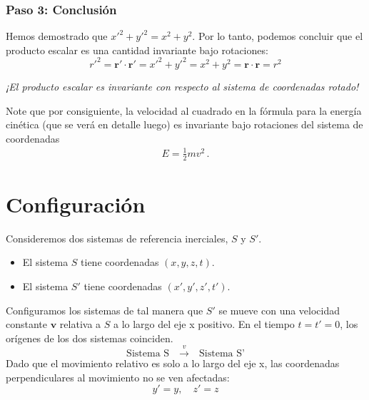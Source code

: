 \documentclass[11pt,a4paper]{article}
\begin{document}
\subsubsection*{Paso 3: Conclusión}
Hemos demostrado que $x'^2 + y'^2 = x^2 + y^2$. Por lo tanto, podemos concluir que el producto escalar es una cantidad invariante bajo rotaciones:
\[
\boxed{
{r'}^2=\boldsymbol{r}' \cdot \boldsymbol{r}' = x'^2 + y'^2 = x^2 + y^2 = \boldsymbol{r} \cdot \boldsymbol{r} = r^2
}
\]


\vspace{1em} %
\noindent %
\textit{¡El producto escalar es invariante con respecto al sistema de coordenadas rotado!}


Note que por consiguiente, la velocidad al cuadrado en la fórmula para la energía cinética (que se verá en detalle luego) es invariante bajo rotaciones del sistema de coordenadas
\begin{align*}
    E =\frac{1}{2}m v^2\,.
\end{align*}

\section{Configuración}

Consideremos dos sistemas de referencia inerciales, $S$ y $S'$.
\begin{itemize}
    \item El sistema $S$ tiene coordenadas $(x, y, z, t)$.
    \item El sistema $S'$ tiene coordenadas $(x', y', z', t')$.
\end{itemize}
Configuramos los sistemas de tal manera que $S'$ se mueve con una velocidad constante $\boldsymbol{v}$ relativa a $S$ a lo largo del eje x positivo. En el tiempo $t=t'=0$, los orígenes de los dos sistemas coinciden.
\[
\text{Sistema S} \quad \xrightarrow{v} \quad \text{Sistema S'}
\]
Dado que el movimiento relativo es solo a lo largo del eje x, las coordenadas perpendiculares al movimiento no se ven afectadas:
\[ y' = y, \quad z' = z \]
\end{document}
